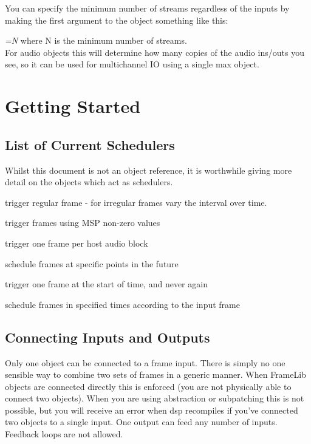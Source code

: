 \documentclass{article}
\newcommand{\flobject}[1]{\textit{fl.#1$\sim$}}
\begin{document}
You can specify the minimum number of streams regardless of the inputs by making the first argument to the object something like this:

\-\hspace{4ex} \textit{=N} where N is the minimum number of streams.\\ 
For audio objects this will determine how many copies of the audio ins/outs you see, so it can be used for multichannel IO using a single max object.
\pagebreak

\section{Getting Started}
\vspace{0.1in}

\subsection{List of Current Schedulers}

Whilst this document is not an object reference, it is worthwhile giving more detail on the objects which act as schedulers.

\begin{description}[align=left, itemindent=3cm, labelwidth=3cm]
\item [\flobject{interval}] trigger regular frame - for irregular frames vary the interval over time.
\item [\flobject{audiotrigger}] trigger frames using MSP non-zero values
\item [\flobject{perblock}] trigger one frame per host audio block
\item [\flobject{future}] schedule frames at specific points in the future
\item [\flobject{once}] trigger one frame at the start of time, and never again
\item [\flobject{chain}] schedule frames in specified times according to the input frame
\end{description}

\subsection{Connecting Inputs and Outputs}

Only one object can be connected to a frame input. There is simply no one sensible way to combine two sets of frames in a generic manner.  When FrameLib objects are connected directly this is enforced (you are not physically able to connect two objects). When you are using abstraction or subpatching this is not possible, but you will receive an error when dsp recompiles if you've connected two objects to a single input. One output can feed any number of inputs. Feedback loops are not allowed.
\end{document}
